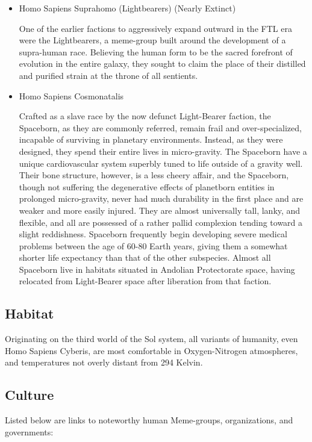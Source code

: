 \begin{itemize}
\item Homo Sapiens Suprahomo (Lightbearers) (Nearly Extinct) 

One of the earlier factions to aggressively expand outward in the FTL
era were the Lightbearers, a meme-group built around the development
of a supra-human race. Believing the human form to be the sacred
forefront of evolution in the entire galaxy, they sought to claim the
place of their distilled and purified strain at the throne of all
sentients.

\item Homo Sapiens Cosmonatalis

Crafted as a slave race by the now defunct Light-Bearer faction, the
Spaceborn, as they are commonly referred, remain frail and
over-specialized, incapable of surviving in planetary
environments. Instead, as they were designed, they spend their entire
lives in micro-gravity. The Spaceborn have a unique cardiovascular
system superbly tuned to life outside of a gravity well.  Their bone
structure, however, is a less cheery affair, and the Spaceborn, though
not suffering the degenerative effects of planetborn entities in
prolonged micro-gravity, never had much durability in the first place
and are weaker and more easily injured. They are almost universally
tall, lanky, and flexible, and all are possessed of a rather pallid
complexion tending toward a slight reddishness. Spaceborn frequently
begin developing severe medical problems between the age of 60-80
Earth years, giving them a somewhat shorter life expectancy than that
of the other subspecies.  Almost all Spaceborn live in habitats
situated in Andolian Protectorate space, having relocated from
Light-Bearer space after liberation from that faction.
\end{itemize}

\subsection{Habitat}

Originating on the third world of the Sol system, all variants of
humanity, even Homo Sapiens Cyberis, are most comfortable in
Oxygen-Nitrogen atmospheres, and temperatures not overly distant from
294 Kelvin.

\subsection{Culture}
Listed below are links to noteworthy human Meme-groups, organizations,
and governments:


